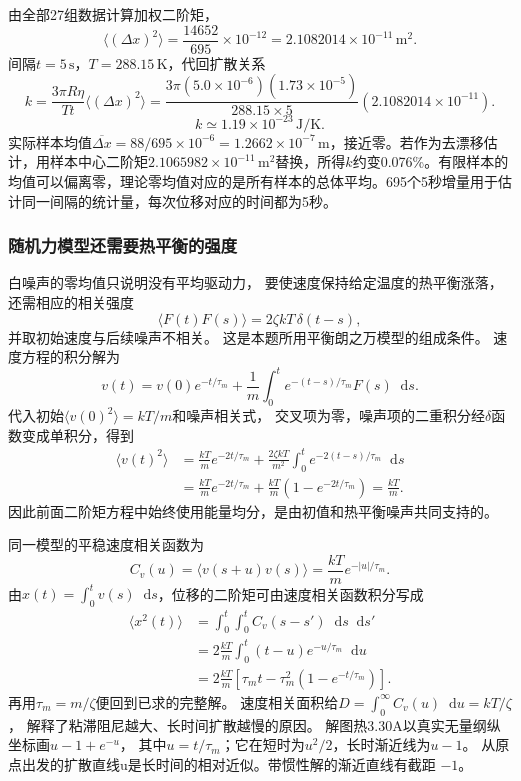 \documentclass[UTF8,fontset=fandol,a4paper,11pt]{ctexart}
\newcommand{\dd}{\mathop{}\!\mathrm{d}}
\newcommand{\result}[1]{\begin{equation*}\boxed{#1}\end{equation*}}
\begin{document}
由全部27组数据计算加权二阶矩，
\[\langle(\Delta x)^2\rangle=\frac{14652}{695}\times10^{-12}
=2.1082014\times10^{-11}\,\mathrm{m^2}.\]
间隔$t=5\,\mathrm s$，$T=288.15\,\mathrm K$，代回扩散关系
\[k=\frac{3\pi R\eta}{Tt}\langle(\Delta x)^2\rangle
=\frac{3\pi(5.0\times10^{-6})(1.73\times10^{-5})}{288.15\times5}
(2.1082014\times10^{-11}).\]
\result{k\simeq1.19\times10^{-23}\,\mathrm{J/K}.}
实际样本均值$\overline{\Delta x}=88/695\times10^{-6}=1.2662\times10^{-7}\,\mathrm m$，接近零。若作为去漂移估计，用样本中心二阶矩$2.1065982\times10^{-11}\,\mathrm{m^2}$替换，所得$k$约变0.076\%。有限样本的均值可以偏离零，理论零均值对应的是所有样本的总体平均。695个5秒增量用于估计同一间隔的统计量，每次位移对应的时间都为5秒。
\subsubsection*{随机力模型还需要热平衡的强度}
白噪声的零均值只说明没有平均驱动力，
要使速度保持给定温度的热平衡涨落，还需相应的相关强度
\[
\langle F(t)F(s)\rangle=2\zeta kT\,\delta(t-s),
\]
并取初始速度与后续噪声不相关。
这是本题所用平衡朗之万模型的组成条件。
速度方程的积分解为
\[
v(t)=v(0)e^{-t/\tau_m}
+\frac1m\int_0^t e^{-(t-s)/\tau_m}F(s)\dd s.
\]
代入初始$\langle v(0)^2\rangle=kT/m$和噪声相关式，
交叉项为零，噪声项的二重积分经$\delta$函数变成单积分，得到
\[
\begin{aligned}
\langle v(t)^2\rangle
&=\frac{kT}{m}e^{-2t/\tau_m}
+\frac{2\zeta kT}{m^2}\int_0^t e^{-2(t-s)/\tau_m}\dd s\\
&=\frac{kT}{m}e^{-2t/\tau_m}
+\frac{kT}{m}(1-e^{-2t/\tau_m})
=\frac{kT}{m}.
\end{aligned}
\]
因此前面二阶矩方程中始终使用能量均分，是由初值和热平衡噪声共同支持的。

同一模型的平稳速度相关函数为
\[
C_v(u)=\langle v(s+u)v(s)\rangle
=\frac{kT}{m}e^{-|u|/\tau_m}.
\]
由$x(t)=\int_0^t v(s)\dd s$，位移的二阶矩可由速度相关函数积分写成
\[
\begin{aligned}
\langle x^2(t)\rangle
&=\int_0^t\!\int_0^t C_v(s-s')\dd s\dd s'\\
&=2\frac{kT}{m}\int_0^t(t-u)e^{-u/\tau_m}\dd u\\
&=2\frac{kT}{m}\left[\tau_mt-\tau_m^2(1-e^{-t/\tau_m})\right].
\end{aligned}
\]
再用$\tau_m=m/\zeta$便回到已求的完整解。
速度相关面积给$D=\int_0^\infty C_v(u)\dd u=kT/\zeta$，
解释了粘滞阻尼越大、长时间扩散越慢的原因。
解图热3.30A以真实无量纲纵坐标画$u-1+e^{-u}$，
其中$u=t/\tau_m$；它在短时为$u^2/2$，长时渐近线为$u-1$。
从原点出发的扩散直线u是长时间的相对近似。带惯性解的渐近直线有截距 $-1$。
\end{document}
